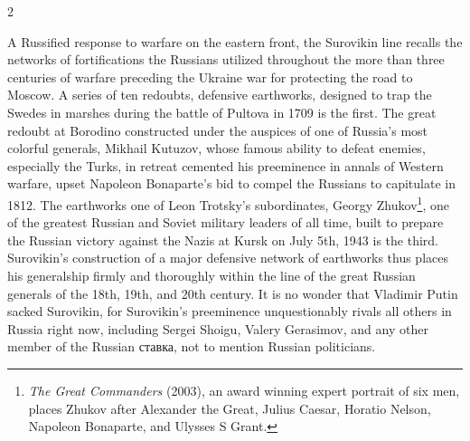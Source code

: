 \documentclass[10pt,a4paper,twoside]{article} %
\begin{document}
\begin{multicols}{2}
{{\newline \indent A Russified response to warfare on the eastern front, the Surovikin line recalls the networks of fortifications the Russians utilized throughout the more than three centuries of warfare preceding the Ukraine war for protecting the road to Moscow. A series of ten  redoubts, defensive earthworks, designed to trap the Swedes in marshes during the battle of Pultova in 1709 is the first. The great redoubt at Borodino constructed under the auspices of one of Russia's most colorful generals, Mikhail Kutuzov, whose famous ability to defeat enemies, especially the Turks, in retreat cemented his preeminence in annals of Western warfare, upset Napoleon Bonaparte's bid to compel the Russians to capitulate in 1812. The earthworks one of Leon Trotsky's subordinates, Georgy Zhukov\footnote{\emph{The Great Commanders} (2003), an award winning expert portrait of six men, places Zhukov after Alexander the Great, Julius Caesar, Horatio Nelson, Napoleon Bonaparte, and Ulysses S Grant.}, one of the greatest Russian and Soviet military leaders of all time, built to prepare the Russian victory against the Nazis at Kursk on July 5th, 1943 is the third. Surovikin's construction of a major defensive network of earthworks thus places his generalship firmly and thoroughly within the line of the great Russian generals of the 18th, 19th, and 20th century. It is no wonder that Vladimir Putin sacked Surovikin, for Surovikin's preeminence unquestionably rivals all others in Russia right now, including Sergei Shoigu, Valery Gerasimov, and any other member of the Russian \textrussian{ставка}, not to mention Russian politicians. 

}

}
\end{multicols}
\end{document}
